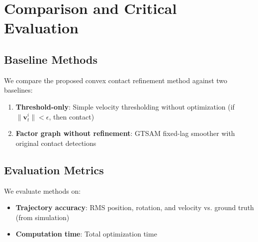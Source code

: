 \documentclass[conference]{IEEEtran}
\begin{document}
\section{Comparison and Critical Evaluation}

\subsection{Baseline Methods}
We compare the proposed convex contact refinement method against two baselines:

\begin{enumerate}
\item \textbf{Threshold-only}: Simple velocity thresholding without optimization (if $\|\mathbf{v}_t^i\| < \epsilon$, then contact)
\item \textbf{Factor graph without refinement}: GTSAM fixed-lag smoother with original contact detections
\end{enumerate}

\subsection{Evaluation Metrics}
We evaluate methods on:
\begin{itemize}
\item \textbf{Trajectory accuracy}: RMS position, rotation, and velocity vs. ground truth (from simulation)
\item \textbf{Computation time}: Total optimization time
\end{itemize}
\end{document}
